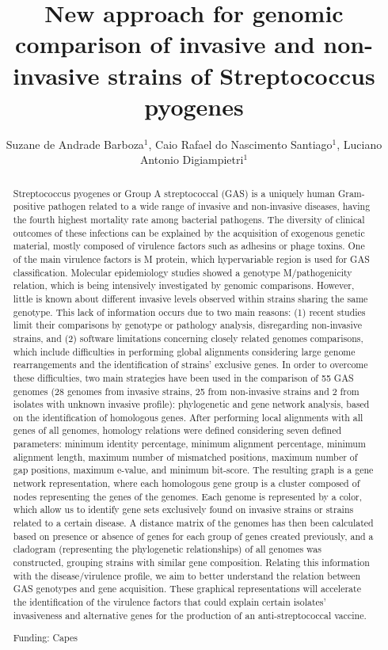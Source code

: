 \documentclass[twoside]{article}
\title{\vspace{-15mm}\fontsize{24pt}{10pt}\selectfont\textbf{New approach for genomic comparison of invasive and non-invasive strains of Streptococcus pyogenes}} %
\author{Suzane de Andrade Barboza$^1$, Caio Rafael do Nascimento Santiago$^1$, Luciano Antonio Digiampietri$^1$}
\affil{1 USP\\ }
\date{}
\begin{document}
\maketitle %

\thispagestyle{fancy} %


\begin{abstract}
Streptococcus pyogenes or Group A streptococcal (GAS) is a uniquely human Gram-positive pathogen related to a wide range of invasive and non-invasive diseases, having the fourth highest mortality rate among bacterial pathogens. The diversity of clinical outcomes of these infections can be explained by the acquisition of exogenous genetic material, mostly composed of virulence factors such as adhesins or phage toxins. One of the main virulence factors is M protein, which hypervariable region is used for GAS classification. Molecular epidemiology studies showed a genotype M/pathogenicity relation, which is being intensively investigated by genomic comparisons. However, little is known about different invasive levels observed within strains sharing the same genotype. This lack of information occurs due to two main reasons: (1) recent studies limit their comparisons by genotype or pathology analysis, disregarding non-invasive strains, and (2) software limitations concerning closely related genomes comparisons, which include difficulties in performing global alignments considering large genome rearrangements and the identification of strains' exclusive genes. In order to overcome these difficulties, two main strategies have been used in the comparison of 55 GAS genomes (28 genomes from invasive strains, 25 from non-invasive strains and 2 from isolates with unknown invasive profile): phylogenetic and gene network analysis, based on the identification of homologous genes. After performing local alignments with all genes of all genomes, homology relations were defined considering seven defined parameters: minimum identity percentage, minimum alignment percentage, minimum alignment length, maximum number of mismatched positions, maximum number of gap positions, maximum e-value, and minimum bit-score. The resulting graph is a gene network representation, where each homologous gene group is a cluster composed of nodes representing the genes of the genomes. Each genome is represented by a color, which allow us to identify gene sets exclusively found on invasive strains or strains related to a certain disease. A distance matrix of the genomes has then been calculated based on presence or absence of genes for each group of genes created previously, and a cladogram (representing the phylogenetic relationships) of all genomes was constructed, grouping strains with similar gene composition. Relating this information with the disease/virulence profile, we aim to better understand the relation between GAS genotypes and gene acquisition. These graphical representations will accelerate the identification of the virulence factors that could explain certain isolates' invasiveness and alternative genes for the production of an anti-streptococcal vaccine.

Funding: Capes
\end{abstract}
\end{document}

